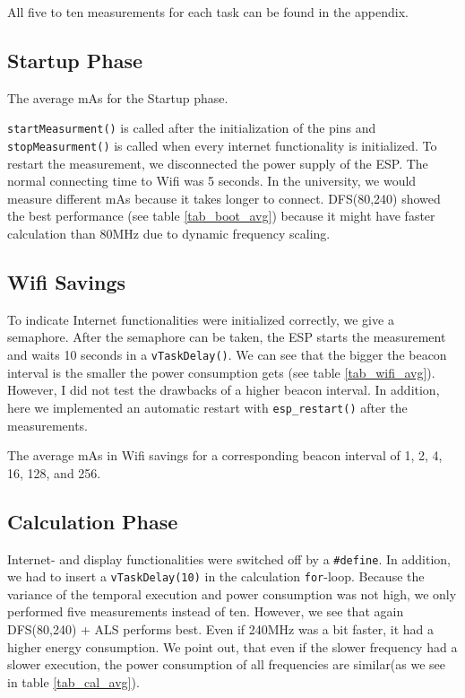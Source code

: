 All five to ten measurements for each task can be found in the appendix.

\subsection{Startup Phase}
\begin{table}[h]
    \centering
    \resizebox{\columnwidth}{!}{%
        
    }
    \caption{The average mAs for the Startup phase.}
    \label{tab_boot_avg}
\end{table}

\verb!startMeasurment()! is called after the initialization of the pins and
\verb!stopMeasurment()! is called when every internet functionality is initialized.
To restart the measurement, we disconnected the power supply of the ESP.
The normal connecting time to Wifi was 5 seconds. In the university, we would measure
different mAs because it takes longer to connect. DFS(80,240) showed the best performance
(see table \ref{tab_boot_avg}) because
it might have faster calculation than 80MHz due to dynamic frequency scaling.

\subsection{Wifi Savings}
To indicate Internet functionalities were initialized correctly, we give a semaphore.
After the semaphore can be taken, the ESP starts the measurement
and waits 10 seconds in a \verb!vTaskDelay()!. We can see that the bigger the beacon
interval is the smaller the power consumption gets (see table \ref{tab_wifi_avg}).
However, I did not test the drawbacks of a higher beacon interval.
In addition, here we implemented an automatic restart with \verb!esp_restart()! after
the measurements.

\begin{table}[h]
    \centering
    \resizebox{\columnwidth}{!}{%
        
    }
    \caption{The average mAs in Wifi savings for a corresponding beacon interval of 1, 2, 4, 16, 128, and 256.}
    \label{tab_wifi_avg}
\end{table}


\subsection{Calculation Phase}

Internet- and display functionalities were switched off by a \verb!#define!. In addition,
we had to insert a \verb!vTaskDelay(10)! in the calculation \verb!for!-loop.
Because the variance of the temporal execution and power consumption was not high, we
only performed five measurements instead of ten. However, we see that again DFS(80,240) + ALS
performs best. Even if 240MHz was a bit faster, it had a higher energy consumption.
We point out, that even if the slower frequency had a slower execution, the power consumption
of all frequencies are similar(as we see in table \ref{tab_cal_avg}).

